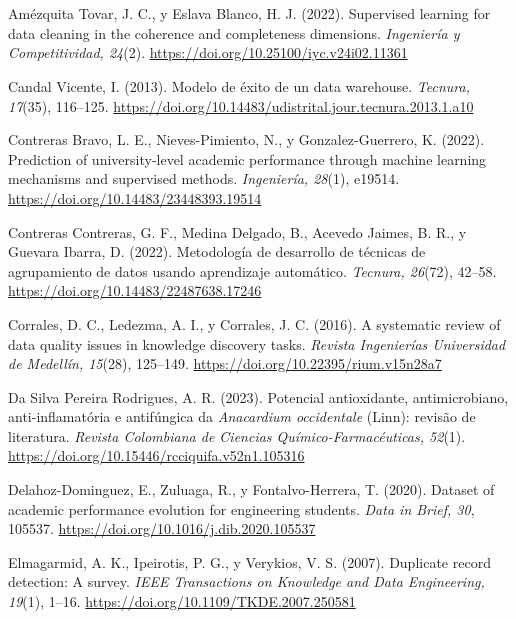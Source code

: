 \documentclass[11pt,openany,oneside,letterpaper]{book}
\makeatletter
\renewenvironment{thebibliography}[1]
  {\chapter*{\bibname}\addcontentsline{toc}{chapter}{\bibname}%
   \def\@biblabel##1{}\list{}{\usecounter{enumiv}\setlength{\leftmargin}{1.27cm}\setlength{\itemindent}{-1.27cm}%
   \setlength{\itemsep}{4pt}\setlength{\parsep}{0pt}}\sloppy}
  {\endlist}
\makeatother
\begin{document}
 \backmatter

\begin{thebibliography}{xx}

 Amézquita Tovar, J. C., y Eslava Blanco, H. J. (2022). Supervised learning for data cleaning in the coherence and completeness dimensions. \emph{Ingeniería y Competitividad, 24}(2). \url{https://doi.org/10.25100/iyc.v24i02.11361}

 Candal Vicente, I. (2013). Modelo de éxito de un data warehouse. \emph{Tecnura, 17}(35), 116--125. \url{https://doi.org/10.14483/udistrital.jour.tecnura.2013.1.a10}

 Contreras Bravo, L. E., Nieves-Pimiento, N., y Gonzalez-Guerrero, K. (2022). Prediction of university-level academic performance through machine learning mechanisms and supervised methods. \emph{Ingeniería, 28}(1), e19514. \url{https://doi.org/10.14483/23448393.19514}

 Contreras Contreras, G. F., Medina Delgado, B., Acevedo Jaimes, B. R., y Guevara Ibarra, D. (2022). Metodología de desarrollo de técnicas de agrupamiento de datos usando aprendizaje automático. \emph{Tecnura, 26}(72), 42--58. \url{https://doi.org/10.14483/22487638.17246}

 Corrales, D. C., Ledezma, A. I., y Corrales, J. C. (2016). A systematic review of data quality issues in knowledge discovery tasks. \emph{Revista Ingenierías Universidad de Medellín, 15}(28), 125--149. \url{https://doi.org/10.22395/rium.v15n28a7}

 Da Silva Pereira Rodrigues, A. R. (2023). Potencial antioxidante, antimicrobiano, anti-inflamatória e antifúngica da \emph{Anacardium occidentale} (Linn): revisão de literatura. \emph{Revista Colombiana de Ciencias Químico-Farmacéuticas, 52}(1). \url{https://doi.org/10.15446/rcciquifa.v52n1.105316}

 Delahoz-Dominguez, E., Zuluaga, R., y Fontalvo-Herrera, T. (2020). Dataset of academic performance evolution for engineering students. \emph{Data in Brief, 30}, 105537. \url{https://doi.org/10.1016/j.dib.2020.105537}

 Elmagarmid, A. K., Ipeirotis, P. G., y Verykios, V. S. (2007). Duplicate record detection: A survey. \emph{IEEE Transactions on Knowledge and Data Engineering, 19}(1), 1--16. \url{https://doi.org/10.1109/TKDE.2007.250581}


\end{thebibliography}
\end{document}
